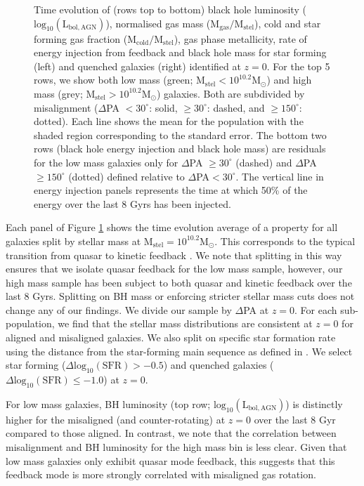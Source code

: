\documentclass[fleqn,usenatbib]{mnras}
\begin{document}
\begin{figure}
    \caption{Time evolution of (rows top to bottom) black hole luminosity ($\mathrm{log_{10}(L_{bol, AGN})}$), normalised gas mass ($\mathrm{M_{gas}/M_{stel}}$), cold and star forming gas fraction ($\mathrm{M_{cold}/M_{stel}}$), gas phase metallicity, rate of energy injection from feedback and black hole mass for star forming (left) and quenched galaxies (right) identified at $z=0$. For the top 5 rows, we show both low mass (green; $\mathrm{M_{stel} < 10^{10.2}M_{\odot}}$) and high mass (grey; $\mathrm{M_{stel} > 10^{10.2}M_{\odot}}$) galaxies. Both are subdivided by misalignment ($\Delta$PA $< 30^{\circ}$: solid, $\geq 30^{\circ}$: dashed, and  $\geq 150^{\circ}$: dotted). Each line shows the mean for the population with the shaded region corresponding to the standard error. The bottom two rows (black hole energy injection and black hole mass) are residuals for the low mass galaxies only for $\Delta$PA $\geq 30^{\circ}$ (dashed) and $\Delta$PA $\geq 150^{\circ}$ (dotted) defined relative to $\Delta$PA$ < 30^{\circ}$. The vertical line in energy injection panels represents the time at which 50\% of the energy over the last 8 Gyrs has been injected.}
    \label{fig:overall_pop}
\end{figure}

Each panel of Figure \ref{fig:overall_pop} shows the time evolution average of a property for all galaxies split by stellar mass at $\mathrm{M_{stel} = 10^{10.2}M_{\odot}}$. This corresponds to the typical transition from quasar to kinetic feedback \citep[i.e. $\mathrm{M_{BH} \approx 10^{8}M_{\odot}}$, see Fig 1 in][]{li2019}. We note that splitting in this way ensures that we isolate quasar feedback for the low mass sample, however, our high mass sample has been subject to both quasar and kinetic feedback over the last 8 Gyrs. Splitting on BH mass or enforcing stricter stellar mass cuts does not change any of our findings. We divide our sample by $\Delta$PA at $z=0$. For each sub-population, we find that the stellar mass distributions are consistent at $z=0$ for aligned and misaligned galaxies. We also split on specific star formation rate using the distance from the star-forming main sequence as defined in \citet{pillepich2019}. We select star forming ($\Delta \mathrm{log_{10}(SFR) > −0.5}$) and quenched galaxies ($\Delta \mathrm{log_{10}(SFR) \leq -1.0}$) at $z=0$.

For low mass galaxies, BH luminosity (top row; $\mathrm{log_{10}(L_{bol, AGN})}$) is distinctly higher for the misaligned (and counter-rotating) at $z=0$ over the last 8 Gyr compared to those aligned. In contrast, we note that the correlation between misalignment and BH luminosity for the high mass bin is less clear. Given that low mass galaxies only exhibit quasar mode feedback, this suggests that this feedback mode is more strongly correlated with misaligned gas rotation. 
\end{document}
